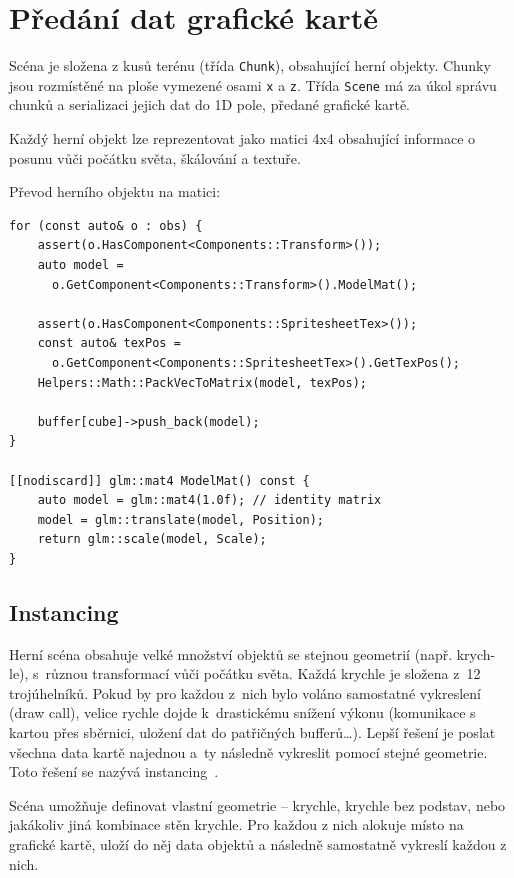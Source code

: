 \documentclass[thesis=M,czech]{FITthesis}[2019/12/23]
\begin{document}
\section{Předání dat grafické kartě}

Scéna je složena z kusů terénu (třída \texttt{Chunk}), obsahující herní objekty. Chunky jsou rozmístěné na ploše vymezené osami \texttt{x} a \texttt{z}. Třída \texttt{Scene} má za úkol správu chunků a serializaci jejich dat do 1D pole, předané grafické kartě.

Každý herní objekt lze reprezentovat jako matici 4x4 obsahující informace o posunu vůči počátku světa, škálování a textuře.


Převod herního objektu na matici:

\begin{verbatim}
for (const auto& o : obs) {
    assert(o.HasComponent<Components::Transform>());
    auto model =
      o.GetComponent<Components::Transform>().ModelMat();

    assert(o.HasComponent<Components::SpritesheetTex>());
    const auto& texPos = 
      o.GetComponent<Components::SpritesheetTex>().GetTexPos();
    Helpers::Math::PackVecToMatrix(model, texPos);

    buffer[cube]->push_back(model);
}

[[nodiscard]] glm::mat4 ModelMat() const {
    auto model = glm::mat4(1.0f); // identity matrix
    model = glm::translate(model, Position);
    return glm::scale(model, Scale);
}
\end{verbatim}

\subsection{Instancing}

Herní scéna obsahuje velké množství objektů se stejnou geometrií (např. krych-le), s~různou transformací vůči počátku světa. Každá krychle je složena z~12 trojúhelníků. Pokud by pro každou z~nich bylo voláno samostatné vykreslení (draw call), velice rychle dojde k~drastickému snížení výkonu (komunikace s kartou přes sběrnici, uložení dat do patřičných bufferů\dots). Lepší řešení je poslat všechna data kartě najednou a~ty následně vykreslit pomocí stejné geometrie. Toto řešení se nazývá instancing~\cite{lopgl_instancing}.

Scéna umožňuje definovat vlastní geometrie -- krychle, krychle bez podstav, nebo jakákoliv jiná kombinace stěn krychle. Pro každou z nich alokuje místo na grafické kartě, uloží do něj data objektů a následně samostatně vykreslí každou z nich.
\end{document}
